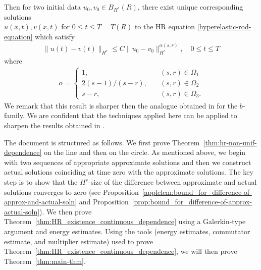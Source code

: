 %
%
Then for two initial data $u_{0}, v_{0} \in B_{H^{s}}(R)$, there exist unique
corresponding solutions \\ $u(x,t), v(x,t)$ for $0 \le t \le T= T(R)$ to the
HR equation \eqref{hyperelastic-rod-equation} which satisfy 
%
%
\begin{equation*}
\begin{split}
\| u(t) - v(t) \|_{H^{r}} \le C \| u_{0} - v_{0} \|_{H^{r}}^{\alpha(s, r)},
\quad 0
\le t \le T
\end{split}
\end{equation*}
%
%
where 
%
%
\begin{equation*}
\begin{split}
\alpha = 
\begin{cases}
1, \quad & (s,r) \in \Omega_{1} 
\\
2(s-1)/(s-r),  \quad & (s, r) \in \Omega_{2}
\\
s-r, \quad & (s, r) \in \Omega_{3}.
\end{cases}
\end{split}
\end{equation*}
%
%
%
%
%
%
%
%
We remark that this result is sharper then the analogue obtained in
\cite{Chen:2011fk} for the $b$-family. We are confident that the techniques
applied here can be applied to sharpen the results obtained in
\cite{Chen:2011fk}.

The document is structured as follows. We first prove 
Theorem~\ref{thm:hr-non-unif-dependence} on the line and 
then on the circle.
As mentioned above, we begin with two sequences of
appropriate approximate solutions and then 
we construct  actual solutions
coinciding at time zero  with the approximate solutions.
The key step is to show that  the $H^s$-size of
the difference between approximate and actual solutions 
converges to zero (see Proposition~\ref{applelem:bound_for_difference-of-approx-and-actual-soln}
and Proposition~\ref{prop:bound_for_difference-of-approx-actual-soln}). 
We then prove Theorem~\ref{thm:HR_existence_continuous_dependence} 
using a Galerkin-type argument and energy estimates. Using the tools (energy estimates, commutator estimate, and multiplier estimate) used to prove Theorem~\ref{thm:HR_existence_continuous_dependence}, we will then prove Theorem~\ref{thm:main-thm}. 
%
%
%	
%
%
%
%
%
%
%
%
%
%
%
